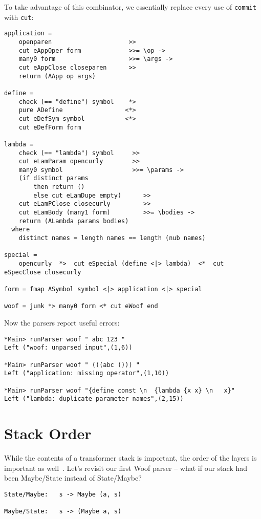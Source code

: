 \documentclass{tmr}
\begin{document}
To take advantage of this combinator, we essentially replace every use of 
\verb+commit+ with \verb+cut+:
\begin{verbatim}
application =
    openparen                     >>
    cut eAppOper form             >>= \op ->
    many0 form                    >>= \args ->
    cut eAppClose closeparen      >>
    return (AApp op args)

define =
    check (== "define") symbol    *>
    pure ADefine                 <*>
    cut eDefSym symbol           <*>
    cut eDefForm form

lambda =
    check (== "lambda") symbol     >>
    cut eLamParam opencurly        >>
    many0 symbol                   >>= \params ->
    (if distinct params 
        then return ()
        else cut eLamDupe empty)      >>
    cut eLamPClose closecurly         >>
    cut eLamBody (many1 form)         >>= \bodies ->
    return (ALambda params bodies)
  where
    distinct names = length names == length (nub names)

special = 
    opencurly  *>  cut eSpecial (define <|> lambda)  <*  cut eSpecClose closecurly

form = fmap ASymbol symbol <|> application <|> special

woof = junk *> many0 form <* cut eWoof end
\end{verbatim}

Now the parsers report useful errors:
\begin{verbatim}
*Main> runParser woof " abc 123 "
Left ("woof: unparsed input",(1,6))

*Main> runParser woof " (((abc ())) "
Left ("application: missing operator",(1,10))

*Main> runParser woof "{define const \n  {lambda {x x} \n   x}"
Left ("lambda: duplicate parameter names",(2,15))
\end{verbatim}





\section{Stack Order}
While the contents of a transformer stack is important, the order of the
layers is important as well~\cite{stack}.  Let's revisit our first Woof parser -- what if our 
stack had been Maybe/State instead of State/Maybe?
\begin{verbatim}
State/Maybe:   s -> Maybe (a, s)

Maybe/State:   s -> (Maybe a, s)
\end{verbatim}
\end{document}
